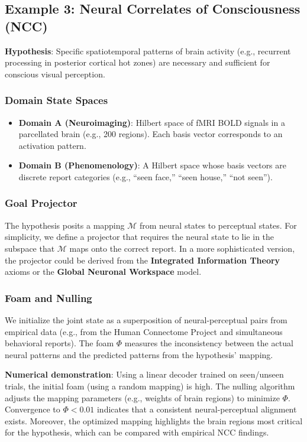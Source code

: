 \documentclass[11pt,a4paper]{article}
\begin{document}
\subsection{Example 3: Neural Correlates of Consciousness (NCC)}

\textbf{Hypothesis}: Specific spatiotemporal patterns of brain activity (e.g., recurrent processing in posterior cortical hot zones) are necessary and sufficient for conscious visual perception.

\subsubsection{Domain State Spaces}
\begin{itemize}
    \item \textbf{Domain A (Neuroimaging)}: Hilbert space of fMRI BOLD signals in a parcellated brain (e.g., 200 regions). Each basis vector corresponds to an activation pattern.
    \item \textbf{Domain B (Phenomenology)}: A Hilbert space whose basis vectors are discrete report categories (e.g., ``seen face,'' ``seen house,'' ``not seen'').
\end{itemize}

\subsubsection{Goal Projector}
The hypothesis posits a mapping \(\mathcal{M}\) from neural states to perceptual states. For simplicity, we define a projector that requires the neural state to lie in the subspace that \(\mathcal{M}\) maps onto the correct report. In a more sophisticated version, the projector could be derived from the \textbf{Integrated Information Theory} axioms or the \textbf{Global Neuronal Workspace} model.

\subsubsection{Foam and Nulling}
We initialize the joint state as a superposition of neural-perceptual pairs from empirical data (e.g., from the Human Connectome Project and simultaneous behavioral reports). The foam \(\Phi\) measures the inconsistency between the actual neural patterns and the predicted patterns from the hypothesis' mapping.

\textbf{Numerical demonstration}: Using a linear decoder trained on seen/unseen trials, the initial foam (using a random mapping) is high. The nulling algorithm adjusts the mapping parameters (e.g., weights of brain regions) to minimize \(\Phi\). Convergence to \(\Phi < 0.01\) indicates that a consistent neural-perceptual alignment exists. Moreover, the optimized mapping highlights the brain regions most critical for the hypothesis, which can be compared with empirical NCC findings.
\end{document}
